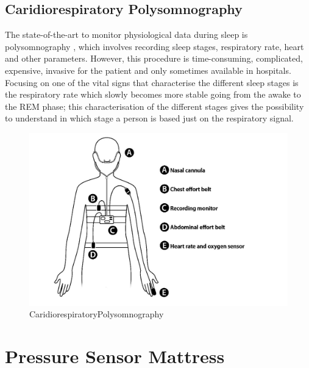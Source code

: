 \vspace*{1.0cm}

\newpage
\subsection*{Caridiorespiratory Polysomnography}
The state-of-the-art to monitor physiological data during sleep is polysomnography \cite{Penzel2016ModulationsPolysomnography}
, which involves recording sleep stages, respiratory rate, heart and other parameters. However, this procedure is time-consuming, 
complicated, expensive, invasive for the patient and only sometimes available in hospitals. 
Focusing on one of the vital signs that characterise the different sleep stages is the respiratory rate 
which slowly becomes more stable going from the awake to the REM phase; this characterisation of the different stages gives the possibility to 
understand in which stage a person is based just on the respiratory signal.
\vspace*{1.0cm}
\begin{figure}[H]
    \centering
    \includegraphics[width=\textwidth]{img/CardioPSG.jpg}
    \caption{CaridiorespiratoryPolysomnography}
    \label{fig:PSGCardio}
\end{figure}
\vspace*{1.0cm}

\newpage
\section{Pressure Sensor Mattress}

